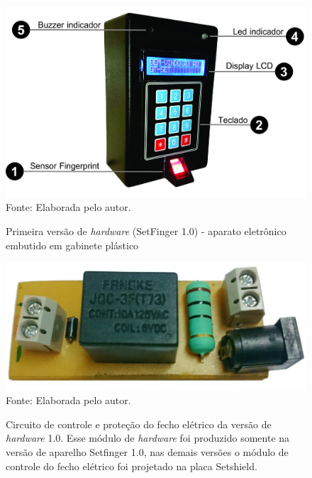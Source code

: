   
\begin{figure}[!t]
  \begin{center}
  \caption{Primeira versão de \textit{hardware} (SetFinger 1.0) - aparato eletrônico embutido em gabinete plástico}
  \includegraphics[scale=0.7]{figuras/cap4/setfinger_v1_2.jpg}\\
  Fonte: Elaborada pelo autor.
  \label{setfinger_v1_2}
  \end{center}
  \end{figure}


\begin{figure}[!t]
  \begin{center}
  \caption{Circuito de controle e proteção do fecho elétrico da versão de \textit{hardware} 1.0. Esse módulo de \textit{hardware} foi produzido somente na versão de aparelho Setfinger 1.0, nas demais versões o módulo de controle do fecho elétrico foi projetado na placa Setshield.}
  \includegraphics[scale=0.25]{figuras/cap4/circuito_fecho.jpg}\\
  Fonte: Elaborada pelo autor.
  \label{circuito_fecho}
  \end{center}
  \end{figure}
  

